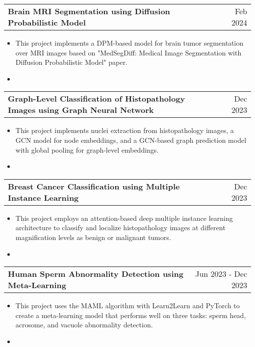 \documentclass[letterpaper,11pt]{article}
\makeatletter
\newcommand{\resumeItem}[2]{
  \item\small{
    {#1 \hfill #2 \vspace{-2pt}}
  }
}
\newcommand{\resumeProjectHeading}[2]{
    \item
    \begin{tabular*}{0.97\textwidth}{l@{\extracolsep{\fill}}r}
      \small#1 & #2 \\
    \end{tabular*}\vspace{-7pt}
}
\newcommand{\resumeItemListStart}{\begin{itemize}}
\newcommand{\resumeItemListEnd}{\end{itemize}\vspace{-5pt}}
\makeatother
\begin{document}
        \resumeProjectHeading
          {\textbf{Brain MRI Segmentation using Diffusion Probabilistic Model}}{Feb 2024}
          \resumeItemListStart
            \resumeItem{This project implements a DPM-based model for brain tumor segmentation over MRI images based on "MedSegDiff: Medical Image Segmentation with Diffusion Probabilistic Model" paper.}{}
            \resumeItem{\href{https://github.com/amirezzati/iabi/blob/main/homeworks/HW6/pract/DDPM_MRI_Seg.ipynb}{\faGithub { GitHub}}}{} 
          \resumeItemListEnd
        

        \resumeProjectHeading
          {\textbf{Graph-Level Classification of Histopathology Images using Graph Neural Network}}{Dec 2023}
          \resumeItemListStart
            \resumeItem{This project implements nuclei extraction from histopathology images, a GCN model for node embeddings, and a GCN-based graph prediction model with global pooling for graph-level embeddings.}{}
            \resumeItem{\href{https://github.com/amirezzati/iabi/blob/main/homeworks/HW4/pract/HW4_GNN.ipynb}{\faGithub { GitHub}}}{}   
          \resumeItemListEnd

        \resumeProjectHeading
          {\textbf{Breast Cancer Classification using Multiple Instance Learning}}{Dec 2023}
          \resumeItemListStart
            \resumeItem{This project employs an attention-based deep multiple instance learning architecture to classify and localize histopathology images at different magnification levels as benign or malignant tumors.}{}
            \resumeItem{\href{https://github.com/amirezzati/iabi/blob/main/homeworks/HW4/pract/HW4_MIL.ipynb}{\faGithub { GitHub}}}{}
          \resumeItemListEnd

        \resumeProjectHeading
          {\textbf{Human Sperm Abnormality Detection using Meta-Learning}}{Jun 2023 - Dec 2023}
          \resumeItemListStart
            \resumeItem{This project uses the MAML algorithm with Learn2Learn and PyTorch to create a meta-learning model that performs well on three tasks: sperm head, acrosome, and vacuole abnormality detection.}{}
            \resumeItem{\href{https://github.com/amirezzati/sperm-abnormality-detection-using-maml}{\faGithub { GitHub}}}{}
          \resumeItemListEnd
\end{document}
